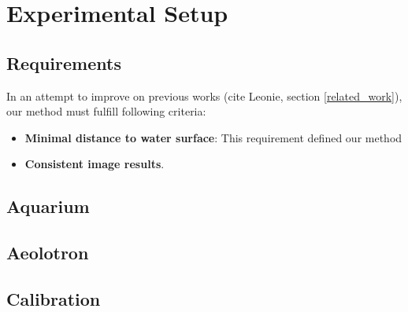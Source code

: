 \chapter{Experimental Setup}\label{experimental_setup}
	\section{Requirements}
		In an attempt to improve on previous works (cite Leonie, section \ref{related_work}), our method must fulfill following criteria:
	\begin{itemize}
		\item \textbf{Minimal distance to water surface}: This requirement defined our method
		\item \textbf{Consistent image results}. 
	\end{itemize}			
		
		
	\section{Aquarium}
	\section{Aeolotron}
	\section{Calibration}